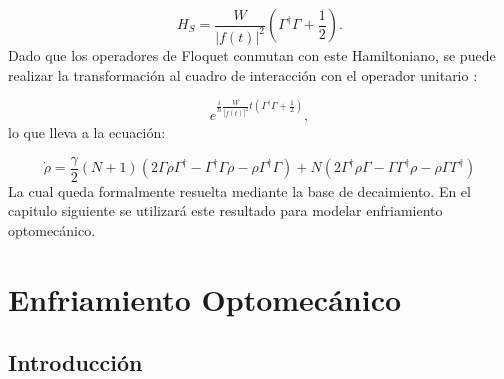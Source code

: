 \documentclass[a4paper,10pt]{report}
\begin{document}
\begin{equation}
H_S = \frac{W}{|f(t)|^2}(\Gamma^\dagger \Gamma + \frac{1}{2}).
\end{equation} Dado que los operadores de Floquet conmutan con este Hamiltoniano, se puede realizar la transformación al cuadro de interacción con el operador unitario \cite{SakuraiQM}:

\begin{equation}
 e^{\frac{i}{\hbar}\frac{W}{|f(t)|^2}t(\Gamma^\dagger \Gamma + \frac{1}{2})},
\end{equation}lo que lleva a la ecuación:

\begin{equation} \label{GammaLindblat}
\dot{\rho}=\frac{\gamma}{2}(N+1)(2\Gamma\rho\Gamma^\dagger - \Gamma^\dagger\Gamma \rho - \rho \Gamma^\dagger \Gamma )
 + N(2\Gamma^\dagger \rho \Gamma - \Gamma \Gamma^\dagger \rho - \rho \Gamma\Gamma^\dagger)
\end{equation}La cual queda formalmente resuelta mediante la base de decaimiento. En el capitulo siguiente se utilizará este resultado para modelar enfriamiento optomecánico.


\chapter{Enfriamiento Optomecánico}

\section{Introducción}
\end{document}
